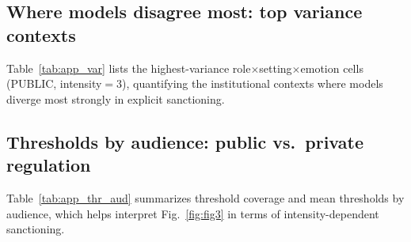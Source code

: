 \documentclass[11pt]{article}
\begin{document}
\subsection{Where models disagree most: top variance contexts}
Table~\ref{tab:app_var} lists the highest-variance role$\times$setting$\times$emotion cells (PUBLIC, intensity$=3$), quantifying the institutional contexts where models diverge most strongly in explicit sanctioning.

\begin{table}[t]
  \centering
  \small
  \caption{\textbf{Appendix Table A1: Top disagreement contexts in E1.} Highest-variance role$\times$setting$\times$emotion cells (PUBLIC, intensity$=3$). Variance is computed across six models' cell-level sanction rates.}
  \label{tab:app_var}
\end{table}

\subsection{Thresholds by audience: public vs.\ private regulation}
Table~\ref{tab:app_thr_aud} summarizes threshold coverage and mean thresholds by audience, which helps interpret Fig.~\ref{fig:fig3} in terms of intensity-dependent sanctioning.
\end{document}

